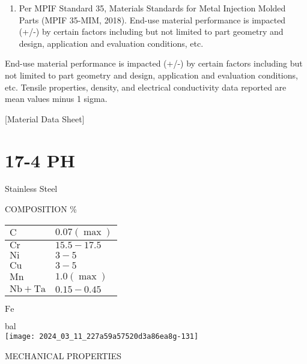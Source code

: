 \documentclass[10pt]{article}
\begin{document}
\begin{enumerate}
  \item Per MPIF Standard 35, Materials Standards for Metal Injection Molded Parts (MPIF 35-MIM, 2018). End-use material performance is impacted (+/-) by certain factors including but not limited to part geometry and design, application and evaluation conditions, etc.
\end{enumerate}

End-use material performance is impacted (+/-) by certain factors including but not limited to part geometry and design, application and evaluation conditions, etc. Tensile properties, density, and electrical conductivity data reported are mean values minus 1 sigma.

[Material Data Sheet]

\section*{17-4 PH}
Stainless Steel

COMPOSITION \%

\begin{center}
\begin{tabular}{ll}
$\mathrm{C}$ & $0.07(\max )$ \\
\hline
$\mathrm{Cr}$ & $15.5-17.5$ \\
\hline
$\mathrm{Ni}$ & $3-5$ \\
\hline
$\mathrm{Cu}$ & $3-5$ \\
\hline
$\mathrm{Mn}$ & $1.0(\max )$ \\
\hline
$\mathrm{Nb}+\mathrm{Ta}$ & $0.15-0.45$ \\
\hline
\end{tabular}
\end{center}

$\mathrm{Fe}$

bal\\
\texttt{[image: 2024\_03\_11\_227a59a57520d3a86ea8g-131]}

MECHANICAL PROPERTIES
\end{document}
